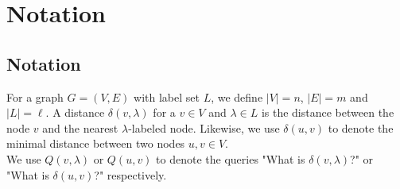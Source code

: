 \section{Notation}\label{notation}

\subsection{Notation}
For a graph $G=(V,E)$ with label set $L$, we define $|V|=n$, $|E|=m$ and $|L|=\ell$. A
distance $\delta(v,\lambda)$ for a $v\in V$ and $\lambda\in L$ is the distance between
the node $v$ and the nearest $\lambda$-labeled node. Likewise, we use $\delta(u,v)$ to denote
the minimal distance between two nodes $u,v\in V$. \\
We use $Q(v,\lambda)$ or $Q(u,v)$ to denote the queries "What is $\delta(v,\lambda)$?" or
"What is $\delta(u,v)$?" respectively.
